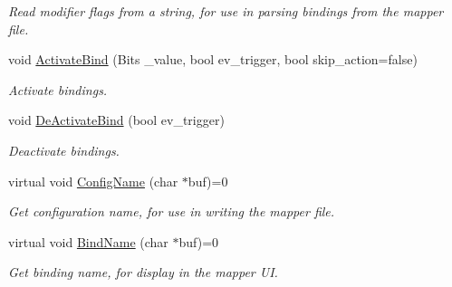 \begin{DoxyCompactItemize}
\begin{DoxyCompactList}\small\item\em Read modifier flags from a string, for use in parsing bindings from the mapper file. \end{DoxyCompactList}\item 
\hypertarget{classCBind_ac1963875b6c478efc92bfa244937d24e}{void \hyperlink{classCBind_ac1963875b6c478efc92bfa244937d24e}{Activate\-Bind} (Bits \-\_\-value, bool ev\-\_\-trigger, bool skip\-\_\-action=false)}\label{classCBind_ac1963875b6c478efc92bfa244937d24e}

\begin{DoxyCompactList}\small\item\em Activate bindings. \end{DoxyCompactList}\item 
\hypertarget{classCBind_a5fcbf42fb58070fd1a81bf892dc73e1c}{void \hyperlink{classCBind_a5fcbf42fb58070fd1a81bf892dc73e1c}{De\-Activate\-Bind} (bool ev\-\_\-trigger)}\label{classCBind_a5fcbf42fb58070fd1a81bf892dc73e1c}

\begin{DoxyCompactList}\small\item\em Deactivate bindings. \end{DoxyCompactList}\item 
\hypertarget{classCBind_a231fb0c4cc20ee05607f1e11b8b1189f}{virtual void \hyperlink{classCBind_a231fb0c4cc20ee05607f1e11b8b1189f}{Config\-Name} (char $\ast$buf)=0}\label{classCBind_a231fb0c4cc20ee05607f1e11b8b1189f}

\begin{DoxyCompactList}\small\item\em Get configuration name, for use in writing the mapper file. \end{DoxyCompactList}\item 
\hypertarget{classCBind_aa9f00238cab696c93603043ca48d456e}{virtual void \hyperlink{classCBind_aa9f00238cab696c93603043ca48d456e}{Bind\-Name} (char $\ast$buf)=0}\label{classCBind_aa9f00238cab696c93603043ca48d456e}

\begin{DoxyCompactList}\small\item\em Get binding name, for display in the mapper U\-I. \end{DoxyCompactList}\end{DoxyCompactItemize}
